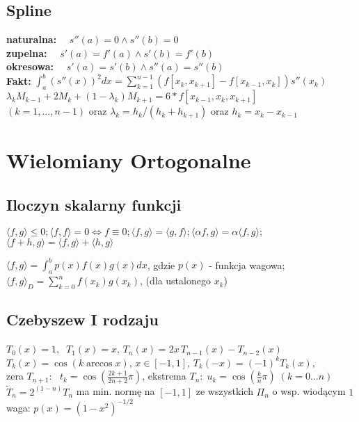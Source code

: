 \documentclass[a4paper,twocolumn]{article}
\begin{document}
\subsection{Spline}
\textbf{naturalna:} $\quad s''(a)=0 \land s''(b)=0$\\
\textbf{zupelna:} $\quad s'(a)=f'(a) \land s'(b)=f'(b)$\\
\textbf{okresowa:} $\quad s'(a)=s'(b) \land s''(a)=s''(b)$\\
\textbf{Fakt:} $\int_a^b \left(s''(x)\right)^2 dx = \sum_{k=1}^{n-1} \left( f\left[x_k,x_{k+1}\right] - f\left[x_{k-1},x_k\right]\right)s''(x_k) $\\
$\lambda_{k}M_{k-1}+2M_{k}+(1-\lambda_{k})M_{k+1}=6*f[x_{k-1},x_{k},x_{k+1}]$\\ $(k=1,...,n-1)$ oraz $\lambda_{k} = h_{k}/(h_{k}+h_{k+1})$ oraz $h_{k}=x_{k} - x_{k-1}$

\section{Wielomiany Ortogonalne}
\subsection{Iloczyn skalarny funkcji}
$\langle f, g \rangle \leq 0; \langle f, f \rangle =0 \Leftrightarrow f \equiv 0 ; \langle f, g \rangle = \langle g, f \rangle ; \langle \alpha f, g \rangle = \alpha \langle f, g \rangle ;$ \\
${\langle f + h, g \rangle = \langle f, g \rangle + \langle h, g \rangle}$

${\langle f, g \rangle = \int_{a}^{b} p(x)f(x)g(x) dx}$, gdzie  $p(x)$ - funkcja wagowa;
${{\langle f, g \rangle}_{D} = \sum_{k=0}^n f(x_k)g(x_k)}$, (dla ustalonego $x_k$)
\subsection{Czebyszew I rodzaju}
$T_0(x) = 1,\;\;T_1(x) = x$, $T_n(x) = 2x\,T_{n-1}(x) - T_{n-2}(x)$\\
$T_{k}(x) = \cos(k\arccos x),\,x\in [-1,1]$, $T_k (-x) = (-1)^k T_k(x)$,\\
zera $T_{n+1}$: \, $t_k=\cos\left(\frac{2k+1}{2n+2}\pi\right)$,
ekstrema $T_{n}:\; u_k = \cos\left(\frac{k}{n}\pi\right)\;(k=0\ldots n)$\\
$\tilde{T}_n = 2^{(1-n)} T_n$ ma min. normę na $[-1,1]$ ze wszystkich $\Pi_{n}$ o wsp. wiodącym $1$ \\
waga: $p(x) = (1-x^2)^{-1/2}$\\
\end{document}
